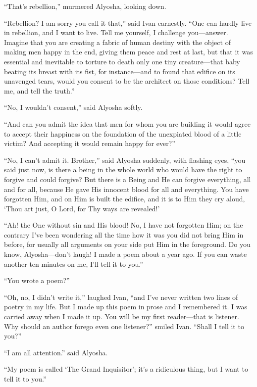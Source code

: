 ``That's rebellion,'' murmered Alyosha, looking down.

``Rebellion? I am sorry you call it that,'' said Ivan earnestly. ``One
can hardly live in rebellion, and I want to live. Tell me yourself, I
challenge you---answer. Imagine that you are creating a fabric of
human destiny with the object of making men happy in the end, giving
them peace and rest at last, but that it was essential and inevitable
to torture to death only one tiny crea\-ture---that baby beating its
breast with its fist, for in\-stance---and to found that edifice on
its unavenged tears, would you consent to be the architect on those
conditions? Tell me, and tell the truth.''

``No, I wouldn't consent,'' said Alyosha softly.

``And can you admit the idea that men for whom you are building it
would agree to accept their happiness on the foundation of the
unexpiated blood of a little victim? And accepting it would remain
happy for ever?''

``No, I can't admit it. Brother,'' said Alyosha suddenly,
with flashing eyes, ``you said just now, is there a being in the whole
world who would have the right to forgive and could forgive? But there
is a Being and He can forgive everything, all and for all, because He
gave His innocent blood for all and everything. You have forgotten
Him, and on Him is built the edifice, and it is to Him they cry aloud,
`Thou art just, O Lord, for Thy ways are revealed!'

``Ah! the One without sin and His blood! No, I have not forgotten Him;
on the contrary I've been wondering all the time how it was you did
not bring Him in before, for usually all arguments on your side put
Him in the foreground. Do you know, Al\-yosh\-a---don't laugh! I made
a poem about a year ago. If you can waste another ten minutes on me,
I'll tell it to you.''

``You wrote a poem?''

``Oh, no, I didn't write it,'' laughed Ivan, ``and I've never written
two lines of poetry in my life. But I made up this poem in prose and I
remembered it. I was carried away when I made it up. You will be my
first read\-er---that is listener. Why should an author forego even
one listener?'' smiled Ivan. ``Shall I tell it to you?''

``I am all attention.'' said Alyosha.

``My poem is called `The Grand Inquisitor'; it's a ridiculous thing,
but I want to tell it to you.''


